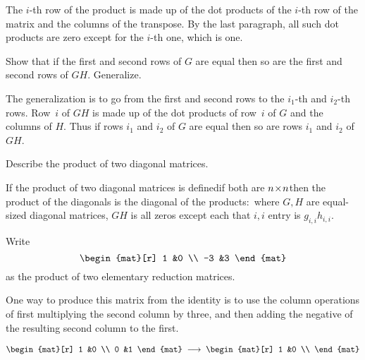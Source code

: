 \begin{exercises}
\begin{answer}
      The \( i \)-th row of the product is made up of the dot products of the
      \( i \)-th row of the matrix and the columns of the transpose.
      By the last paragraph, all such dot products are zero except for the
      \( i \)-th one, which is one.  
    \end{answer}
  \item 
    Show that if the first and second rows of \( G \) are equal then so
    are the first and second rows of \( GH \).
    Generalize.
    \begin{answer}
      The generalization is to go from the first and second rows to the
      $i_1$-th and $i_2$-th rows.
      Row~$i$ of \( GH \) is made up of the dot products of
      row~$i$ of \( G \) and the columns of \( H \).
      Thus if rows \( i_1 \) and \( i_2 \) of \( G \) are equal then so are
      rows \( i_1 \) and \( i_2 \) of \( GH \).  
    \end{answer}
  \item 
    Describe the product of two diagonal matrices.
    \begin{answer}
      If the product of two diagonal matrices is defined\Dash if 
      both are $n \! \times \! n$\Dash then 
      the product of the diagonals is the diagonal
      of the products:~where \( G,H \) are equal-sized diagonal matrices,
      \( GH \) is all zeros except each that \( i,i \) entry is
      \( g_{i,i}h_{i,i} \).
    \end{answer}
  \item 
    Write
    \begin{equation*}
      \begin{mat}[r]
        1   &0  \\
        -3  &3
      \end{mat}
    \end{equation*}
    as the product of two elementary reduction matrices.
    \begin{answer}
      One way to produce this matrix from the identity is to use 
      the column operations
      of first multiplying the second column by three, and then adding the 
      negative of the resulting second column to the first.
      \begin{equation*}
        \begin{mat}[r]
          1  &0  \\
          0  &1
        \end{mat}
        \;\grstep{}\;
        \begin{mat}[r]
          1  &0  \\

\end{mat}
\end{equation*}
\end{answer}
\end{exercises}
